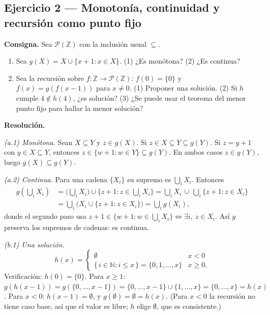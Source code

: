 \subsection*{Ejercicio 2 — Monotonía, continuidad y recursión como punto fijo}
\textbf{Consigna.} Sea $\mathcal{P}(\mathbb{Z})$ con la inclusión usual $\subseteq$.
\begin{enumerate}
  \item[(a)] Sea $g(X) = X \cup \{x+1 : x \in X\}$. (1) ¿Es monótona? (2) ¿Es continua?
  \item[(b)] Sea la recursión sobre $f : \mathbb{Z} \to \mathcal{P}(\mathbb{Z})$:
        $f(0) = \{0\}$ y $f(x) = g(f(x-1))$ para $x \neq 0$.
        (1) Proponer una solución. (2) Si $h$ cumple $4 \notin h(4)$, ¿es solución?
        (3) ¿Se puede usar el teorema del menor punto fijo para hallar la menor solución?
\end{enumerate}

\noindent\textbf{Resolución.}

\smallskip
\noindent\emph{(a.1) Monótona.} Sean $X \subseteq Y$ y $z \in g(X)$. Si $z \in X \subseteq Y \subseteq g(Y)$.
Si $z = y+1$ con $y \in X \subseteq Y$, entonces $z \in \{w+1 : w \in Y\} \subseteq g(Y)$.
En ambos casos $z \in g(Y)$, luego $g(X) \subseteq g(Y)$.

\smallskip
\noindent\emph{(a.2) Continua.} Para una cadena $\{X_i\}$ su supremo es $\bigcup_i X_i$. Entonces
\[
\begin{aligned}
g\!\left(\bigcup_i X_i\right)
&= \Big(\bigcup_i X_i\Big) \cup \Big\{z+1 : z \in \bigcup_i X_i\Big\}
 = \bigcup_i X_i \,\cup\, \bigcup_i \{z+1 : z \in X_i\} \\
&= \bigcup_i \big( X_i \cup \{z+1 : z \in X_i\} \big)
 = \bigcup_i g(X_i),
\end{aligned}
\]
donde el segundo paso usa $z+1 \in \{w+1 : w \in \bigcup_i X_i\} \iff \exists i,\ z \in X_i$.
Así $g$ preserva los supremos de cadenas: es continua.

\smallskip
\noindent\emph{(b.1) Una solución.}
\[
h(x) = \begin{cases} \emptyset & x < 0 \\ \{\,i \in \mathbb{N} : i \le x\,\} = \{0,1,\dots,x\} & x \ge 0. \end{cases}
\]
Verificación: $h(0) = \{0\}$. Para $x \ge 1$: $g(h(x-1)) = g(\{0,\dots,x-1\}) = \{0,\dots,x-1\}\cup\{1,\dots,x\} = \{0,\dots,x\} = h(x)$.
Para $x < 0$: $h(x-1) = \emptyset$, y $g(\emptyset) = \emptyset = h(x)$. (Para $x<0$ la recursión
no tiene caso base, así que el valor es libre; $h$ elige $\emptyset$, que es consistente.)

